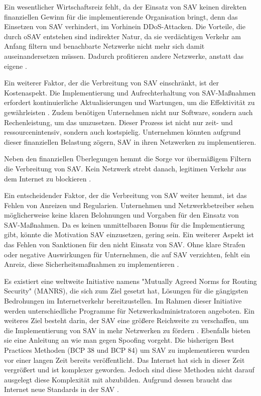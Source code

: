 \documentclass[sigplan,screen]{acmart}
\begin{document}
Ein wesentlicher Wirtschaftsreiz fehlt, da der Einsatz von SAV keinen direkten finanziellen Gewinn für die implementierende Organisation bringt, denn das Einsetzen von SAV verhindert, im Vorhinein DDoS-Attacken. Die Vorteile, die durch oSAV entstehen sind indirekter Natur, da sie verdächtigen Verkehr am Anfang filtern und benachbarte Netzwerke nicht mehr sich damit auseinandersetzen müssen. Dadurch profitieren andere Netzwerke, anstatt das eigene \cite{CRP01}.

Ein weiterer Faktor, der die Verbreitung von SAV einschränkt, ist der Kostenaspekt. Die Implementierung und Aufrechterhaltung von SAV-Maßnahmen erfordert kontinuierliche Aktualisierungen und Wartungen, um die Effektivität zu gewährleisten \cite{Lone01}. Zudem benötigen Unternehmen nicht nur Software, sondern auch Rechenleistung, um das umzusetzen. Dieser Prozess ist nicht nur zeit- und ressourcenintensiv, sondern auch kostspielig. Unternehmen könnten aufgrund dieser finanziellen Belastung zögern, SAV in ihren Netzwerken zu implementieren.

Neben den finanziellen Überlegungen hemmt die Sorge vor übermäßigem Filtern die Verbreitung von SAV. Kein Netzwerk strebt danach, legitimen Verkehr aus dem Internet zu blockieren \cite{FrontDoor01}.

Ein entscheidender Faktor, der die Verbreitung von SAV weiter hemmt, ist das Fehlen von Anreizen und Regularien. Unternehmen und Netzwerkbetreiber sehen möglicherweise keine klaren Belohnungen und Vorgaben für den Einsatz von SAV-Maßnahmen. Da es keinen unmittelbaren Bonus für die Implementierung gibt, könnte die Motivation SAV einzusetzen, gering sein. Ein weiterer Aspekt ist das Fehlen von Sanktionen für den nicht Einsatz von SAV. Ohne klare Strafen oder negative Auswirkungen für Unternehmen, die auf SAV verzichten, fehlt ein Anreiz, diese Sicherheitsmaßnahmen zu implementieren \cite{Lone01}.

Es existiert eine weltweite Initiative namens "Mutually Agreed Norms for Routing Security" (MANRS), die sich zum Ziel gesetzt hat, Lösungen für die gängigsten Bedrohungen im Internetverkehr bereitzustellen. Im Rahmen dieser Initiative werden unterschiedliche Programme für Netzwerkadministratoren angeboten. Ein weiteres Ziel besteht darin, der SAV eine größere Reichweite zu verschaffen, um die Implementierung von SAV in mehr Netzwerken zu fördern \cite{manrs01}. Ebenfalls bieten sie eine Anleitung \cite{anti-spoofing01} an wie man gegen Spoofing vorgeht.
Die bisherigen Best Practices Methoden (BCP 38 und BCP 84) um SAV zu implementieren wurden vor einer langen Zeit bereits veröffentlicht. Das Internet hat sich in dieser Zeit vergrößert und ist komplexer geworden. Jedoch sind diese Methoden nicht darauf ausgelegt diese Komplexität mit abzubilden.  Aufgrund dessen braucht das Internet neue Standards in der SAV \cite{SAV_requirements01}.
\end{document}
